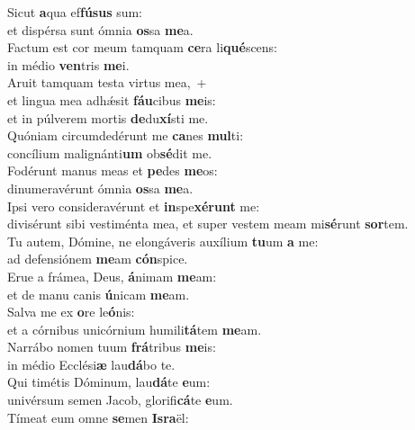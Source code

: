 \evenverse Sicut \textbf{a}qua ef\textbf{fú}\textbf{sus} sum:~\*\\
\evenverse et dispérsa sunt ómnia \textbf{os}sa \textbf{me}a.\\
\oddverse Factum est cor meum tamquam \textbf{ce}ra li\textbf{qué}scens:~\*\\
\oddverse in médio \textbf{ven}tris \textbf{me}i.\\
\evenverse Aruit tamquam testa virtus mea,~+\\
\evenverse  et lingua mea adhǽsit \textbf{fáu}cibus \textbf{me}is:~\*\\
\evenverse et in púlverem mortis \textbf{de}du\textbf{xí}sti me.\\
\oddverse Quóniam circumdedérunt me \textbf{ca}nes \textbf{mul}ti:~\*\\
\oddverse concílium malignánti\textbf{um} ob\textbf{sé}dit me.\\
\evenverse Fodérunt manus meas et \textbf{pe}des \textbf{me}os:~\*\\
\evenverse dinumeravérunt ómnia \textbf{os}sa \textbf{me}a.\\
\oddverse Ipsi vero consideravérunt et \textbf{in}spe\textbf{xé}\textbf{runt} me:~\*\\
\oddverse divisérunt sibi vestiménta mea, et super vestem meam mi\textbf{sé}runt \textbf{sor}tem.\\
\evenverse Tu autem, Dómine, ne elongáveris auxílium \textbf{tu}um \textbf{a} me:~\*\\
\evenverse ad defensiónem \textbf{me}am \textbf{cón}spice.\\
\oddverse Erue a frámea, Deus, \textbf{á}nimam \textbf{me}am:~\*\\
\oddverse et de manu canis \textbf{ú}nicam \textbf{me}am.\\
\evenverse Salva me ex \textbf{o}re le\textbf{ó}nis:~\*\\
\evenverse et a córnibus unicórnium humili\textbf{tá}tem \textbf{me}am.\\
\oddverse Narrábo nomen tuum \textbf{frá}tribus \textbf{me}is:~\*\\
\oddverse in médio Ecclési\textbf{æ} lau\textbf{dá}bo te.\\
\evenverse Qui timétis Dóminum, lau\textbf{dá}te \textbf{e}um:~\*\\
\evenverse univérsum semen Jacob, glorifi\textbf{cá}te \textbf{e}um.\\
\oddverse Tímeat eum omne \textbf{se}men \textbf{Is}\textbf{ra}ël:~\*\\
